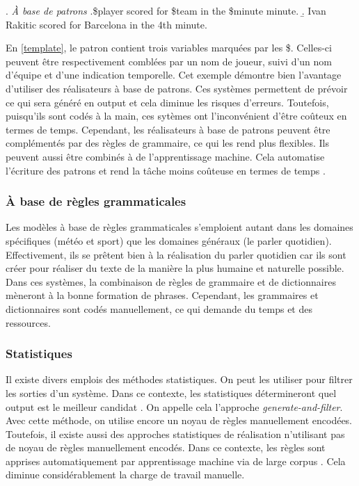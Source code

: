 \ex. \label{template} \emph{À base de patrons}
	\a.\$player scored for \$team in the \$minute minute. 
	\b. Ivan Rakitic scored for Barcelona in the 4th minute.

En \ref{template}, le patron contient trois variables marquées par les \$. Celles-ci peuvent être respectivement comblées par un nom de joueur, suivi d'un nom d'équipe et d'une indication temporelle. Cet exemple démontre bien l'avantage d'utiliser des réalisateurs à base de patrons. Ces systèmes permettent de prévoir ce qui sera généré en output et cela diminue les risques d'erreurs. Toutefois, puisqu'ils sont codés à la main, ces sytèmes ont l'inconvénient d'être coûteux en termes de temps. Cependant, les réalisateurs à base de patrons peuvent être complémentés par des règles de grammaire, ce qui les rend plus flexibles. Ils peuvent aussi être combinés à de l'apprentissage machine. Cela automatise l'écriture des patrons et rend la tâche moins coûteuse en termes de temps \citep{gatt18}.

\subsubsection{À base de règles grammaticales}
Les modèles à base de règles grammaticales s'emploient autant dans les domaines spécifiques (météo et sport) que les domaines généraux (le parler quotidien). Effectivement, ils se prêtent bien à la réalisation du parler quotidien car ils sont créer pour réaliser du texte de la manière la plus humaine et naturelle possible. Dans ces systèmes, la combinaison de règles de grammaire et de dictionnaires mèneront à la bonne formation de phrases. Cependant, les grammaires et dictionnaires sont codés manuellement, ce qui demande du temps et des ressources.

\subsubsection{Statistiques}
Il existe divers emplois des méthodes statistiques. On peut les utiliser pour filtrer les sorties d'un système. Dans ce contexte, les statistiques détermineront quel output est le meilleur candidat \citep{LangkildeForestbasedStatisticalSentence2000}. On appelle cela l'approche \emph{generate-and-filter}. Avec cette méthode, on utilise encore un noyau de règles manuellement encodées. Toutefois, il existe aussi des approches statistiques de réalisation n'utilisant pas de noyau de règles manuellement encodés. Dans ce contexte, les règles sont apprises automatiquement par apprentissage machine via de large corpus \citep{WhiteMinimalDependencyLength2012}. Cela diminue considérablement la charge de travail manuelle.

